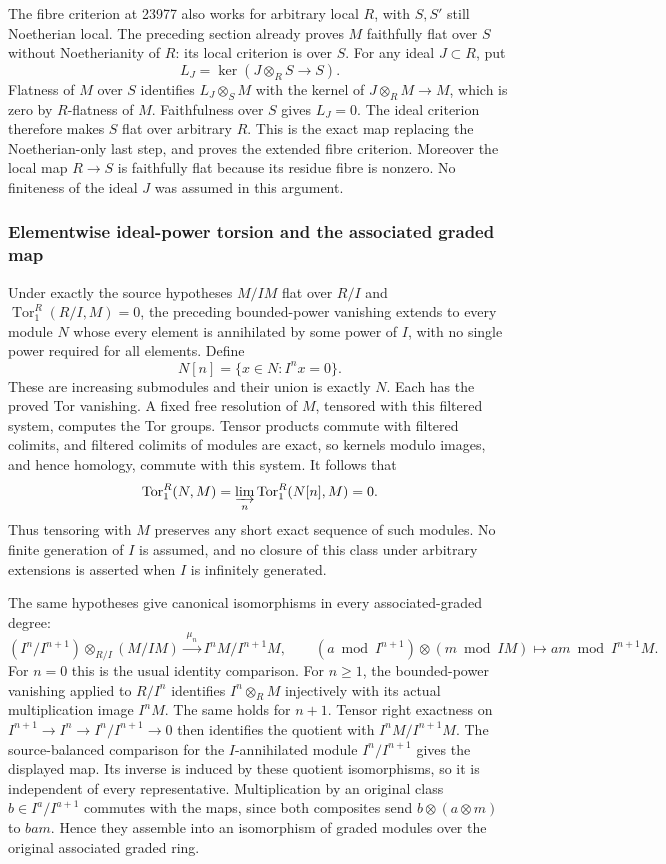 The fibre criterion at 23977 also works for arbitrary local \(R\), with \(S,S'\) still Noetherian local. The preceding section already proves \(M\) faithfully flat over \(S\) without Noetherianity of \(R\): its local criterion is over \(S\). For any ideal \(J\subset R\), put \[
L_J=\ker(J\otimes_RS\to S).
\] Flatness of \(M\) over \(S\) identifies \(L_J\otimes_SM\) with the kernel of \(J\otimes_RM\to M\), which is zero by \(R\)-flatness of \(M\). Faithfulness over \(S\) gives \(L_J=0\). The ideal criterion therefore makes \(S\) flat over arbitrary \(R\). This is the exact map replacing the Noetherian-only last step, and proves the extended fibre criterion. Moreover the local map \(R\to S\) is faithfully flat because its residue fibre is nonzero. No finiteness of the ideal \(J\) was assumed in this argument.

\subsubsection{Elementwise ideal-power torsion and the associated graded map}\label{elementwise-ideal-power-torsion-and-the-associated-graded-map}

Under exactly the source hypotheses \(M/IM\) flat over \(R/I\) and \(\operatorname{Tor}_1^R(R/I,M)=0\), the preceding bounded-power vanishing extends to every module \(N\) whose every element is annihilated by some power of \(I\), with no single power required for all elements. Define \[
N[n]=\{x\in N:I^nx=0\}.
\] These are increasing submodules and their union is exactly \(N\). Each has the proved Tor vanishing. A fixed free resolution of \(M\), tensored with this filtered system, computes the Tor groups. Tensor products commute with filtered colimits, and filtered colimits of modules are exact, so kernels modulo images, and hence homology, commute with this system. It follows that \[
\operatorname{Tor}_1^R(N,M)=
 \varinjlim_n\operatorname{Tor}_1^R(N[n],M)=0.
\] Thus tensoring with \(M\) preserves any short exact sequence of such modules. No finite generation of \(I\) is assumed, and no closure of this class under arbitrary extensions is asserted when \(I\) is infinitely generated.

The same hypotheses give canonical isomorphisms in every associated-graded degree: \[
(I^n/I^{n+1})\otimes_{R/I}(M/IM)
 \xrightarrow{\;\mu_n\;} I^nM/I^{n+1}M,\qquad
(a\bmod I^{n+1})\otimes(m\bmod IM)\longmapsto am\bmod I^{n+1}M.
\] For \(n=0\) this is the usual identity comparison. For \(n\geq1\), the bounded-power vanishing applied to \(R/I^n\) identifies \(I^n\otimes_RM\) injectively with its actual multiplication image \(I^nM\). The same holds for \(n+1\). Tensor right exactness on \(I^{n+1}\to I^n\to I^n/I^{n+1}\to0\) then identifies the quotient with \(I^nM/I^{n+1}M\). The source-balanced comparison for the \(I\)-annihilated module \(I^n/I^{n+1}\) gives the displayed map. Its inverse is induced by these quotient isomorphisms, so it is independent of every representative. Multiplication by an original class \(b\in I^a/I^{a+1}\) commutes with the maps, since both composites send \(b\otimes(a\otimes m)\) to \(bam\). Hence they assemble into an isomorphism of graded modules over the original associated graded ring.


